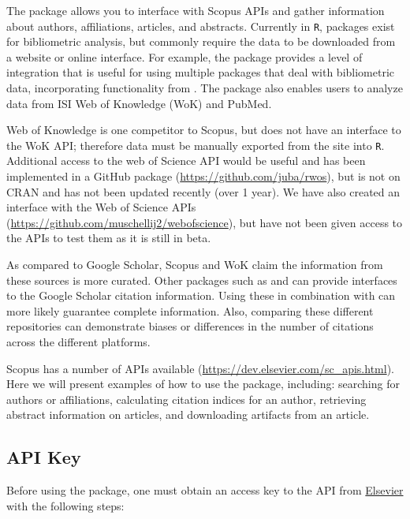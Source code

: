 The  package allows you to interface with Scopus APIs and
gather information about authors, affiliations, articles, and abstracts.
Currently in \texttt{R}, packages exist for bibliometric analysis, but
commonly require the data to be downloaded from a website or online
interface. For example, the  \citep{bibliometrix}
package provides a level of integration that is useful for using
multiple packages that deal with bibliometric data, incorporating
functionality from . The  package also
enables users to analyze data from ISI Web of Knowledge (WoK) and
PubMed.

Web of Knowledge is one competitor to Scopus, but 
does not have an interface to the WoK API; therefore data must be
manually exported from the site into \texttt{R}. Additional access to
the web of Science API would be useful and has been implemented in a
GitHub package  (\url{https://github.com/juba/rwos}), but is
not on CRAN and has not been updated recently (over 1 year). We have
also created an interface with the Web of Science APIs
(\url{https://github.com/muschellij2/webofscience}), but have not been
given access to the APIs to test them as it is still in beta.

As compared to Google Scholar, Scopus and WoK claim the information from
these sources is more curated. Other packages such as 
\citep{scholar} and  \citep{gcite} can provide interfaces to
the Google Scholar citation information. Using these in combination with
 can more likely guarantee complete information. Also,
comparing these different repositories can demonstrate biases or
differences in the number of citations across the different platforms.

Scopus has a number of APIs available
(\url{https://dev.elsevier.com/sc_apis.html}). Here we will present
examples of how to use the  package, including: searching
for authors or affiliations, calculating citation indices for an author,
retrieving abstract information on articles, and downloading artifacts
from an article.

\hypertarget{api-key}{%
\subsection{API Key}\label{api-key}}

Before using the package, one must obtain an access key to the API from
\href{https://dev.elsevier.com/apikey/manage}{Elsevier} with the
following steps:

